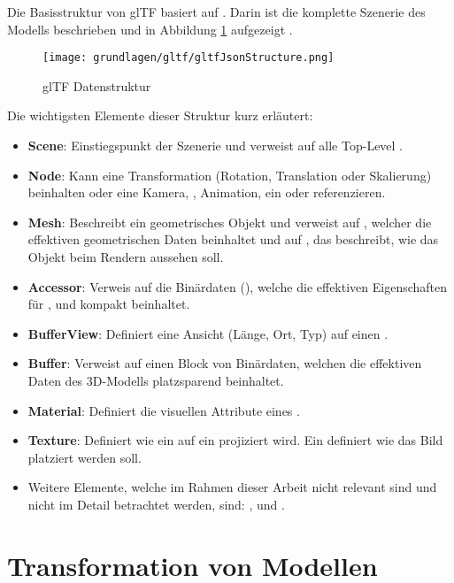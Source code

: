 Die Basisstruktur von glTF basiert auf . Darin ist die komplette Szenerie des Modells beschrieben und in Abbildung \ref{fig:gltfDatastructure} aufgezeigt \cite{gltfTutorialStructure}.
\begin{figure}[H]
  \centering
  \texttt{[image: grundlagen/gltf/gltfJsonStructure.png]}
  \caption{glTF Datenstruktur \cite{gltfTutorialStructure}}
  \label{fig:gltfDatastructure}
\end{figure}

Die wichtigsten Elemente dieser Struktur kurz erläutert:
\begin{itemize}
  \item \textbf{Scene}: Einstiegspunkt der Szenerie und verweist auf alle Top-Level .
  \item \textbf{Node}: Kann eine Transformation (Rotation, Translation oder Skalierung) beinhalten oder eine Kamera, , Animation, ein  oder  referenzieren.
  \item  \textbf{Mesh}: Beschreibt ein geometrisches Objekt und verweist auf , welcher die effektiven geometrischen Daten beinhaltet und auf , das beschreibt, wie das Objekt beim Rendern aussehen soll.
  \item \textbf{Accessor}: Verweis auf die Binärdaten (), welche die effektiven Eigenschaften für ,  und  kompakt beinhaltet.
  \item \textbf{BufferView}: Definiert eine Ansicht (Länge, Ort, Typ) auf einen .
  \item \textbf{Buffer}: Verweist auf einen Block von Binärdaten, welchen die effektiven Daten des 3D-Modells platzsparend beinhaltet.
  \item \textbf{Material}: Definiert die visuellen Attribute eines .
  \item \textbf{Texture}: Definiert wie ein  auf ein  projiziert wird. Ein  definiert wie das Bild platziert werden soll.
  \item Weitere Elemente, welche im Rahmen dieser Arbeit nicht relevant sind und nicht im Detail betrachtet werden, sind: ,  und .
\end{itemize}

\section{Transformation von Modellen}

